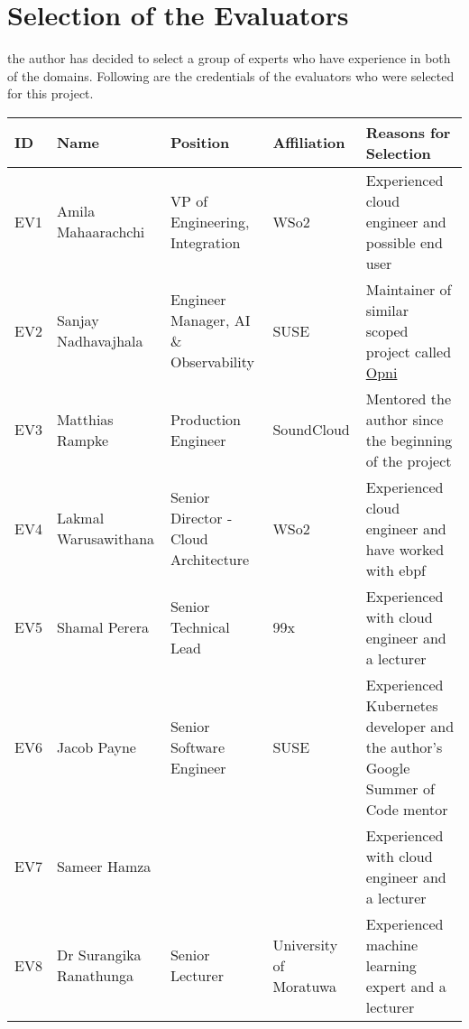 \section{Selection of the Evaluators}

the author has decided to select a group of experts who have experience in both of the domains. Following are the credentials of the evaluators who were selected for this project. 



\begin{longtable}{|p{8mm}|p{35mm}|p{35mm}|p{21mm}|p{50mm}|}
    \hline
    \textbf{ID} &
    \textbf{Name} &
    \textbf{Position} &
    \textbf{Affiliation} &
    \textbf{Reasons for Selection} \\ \hline
  EV1 &
    Amila Mahaarachchi &
    VP of Engineering, Integration &
    WSo2 &
    Experienced cloud engineer  and possible end user \\ \hline
  EV2 & Sanjay Nadhavajhala & Engineer Manager, AI \& Observability & SUSE & Maintainer of similar scoped project called \href{https://opni.io/}{Opni} \\ \hline
  EV3 &
    Matthias Rampke &
    Production Engineer &
    SoundCloud &
    Mentored the author since the beginning of the project \\ \hline
  EV4 &
    Lakmal Warusawithana &
    Senior Director - Cloud Architecture &
    WSo2 &
    Experienced cloud engineer and have worked with \ac{ebpf} \\ \hline
  EV5 &
    Shamal Perera &
    Senior Technical Lead &
    99x &
    Experienced with cloud engineer and a lecturer \\ \hline
  EV6 &
    Jacob Payne &
    Senior Software Engineer &
    SUSE &
    Experienced Kubernetes developer and the author’s Google Summer of Code mentor \\ \hline
  EV7 &
    Sameer Hamza &
     &
     &
    Experienced with cloud engineer and a lecturer \\ \hline
  EV8 &
    Dr Surangika Ranathunga &
    Senior Lecturer &
    University of Moratuwa &
    Experienced machine learning expert and a lecturer \\ \hline
\end{longtable}

